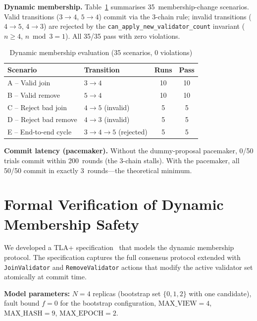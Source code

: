 \smallskip\noindent\textbf{Dynamic membership.}\quad
Table~\ref{tab:membership} summarises 35~membership-change scenarios.  Valid transitions
($3{\to}4$, $5{\to}4$) commit via the 3-chain rule; invalid transitions ($4{\to}5$,
$4{\to}3$) are rejected by the \texttt{can\_apply\_new\_validator\_count} invariant
($n \ge 4$, $n \bmod 3 = 1$).  All 35/35 pass with zero violations.

\begin{table}[t]
\caption{Dynamic membership evaluation (35 scenarios, 0 violations)}
\centering
\begin{tabular}{llcc}
\toprule
\textbf{Scenario} & \textbf{Transition} & \textbf{Runs} & \textbf{Pass} \\
\midrule
A -- Valid join       & $3 \to 4$                          & 10 & 10 \\
B -- Valid remove     & $5 \to 4$                          & 10 & 10 \\
C -- Reject bad join  & $4 \to 5$ (invalid)                & 5  & 5  \\
D -- Reject bad remove& $4 \to 3$ (invalid)                & 5  & 5  \\
E -- End-to-end cycle & $3{\to}4{\to}5$ (rejected)         & 5  & 5  \\
\bottomrule
\end{tabular}
\label{tab:membership}
\end{table}

\smallskip\noindent\textbf{Commit latency (pacemaker).}\quad
Without the dummy-proposal pacemaker, 0/50 trials commit within 200~rounds (the 3-chain
stalls).  With the pacemaker, all 50/50 commit in exactly 3~rounds---the theoretical
minimum.

\section{Formal Verification of Dynamic Membership Safety}
\label{sec:formal_verification}

We developed a TLA+ specification~\cite{lamport2002tla+} that models the dynamic membership
protocol.  The specification captures the full consensus protocol extended with
\texttt{JoinValidator} and \texttt{RemoveValidator} actions that modify the active validator
set atomically at commit time.

\smallskip\noindent\textbf{Model parameters:}\quad
$N{=}4$ replicas (bootstrap set $\{0,1,2\}$ with one candidate), fault bound $f{=}0$ for
the bootstrap configuration, $\text{MAX\_VIEW}{=}4$, $\text{MAX\_HASH}{=}9$,
$\text{MAX\_EPOCH}{=}2$.

